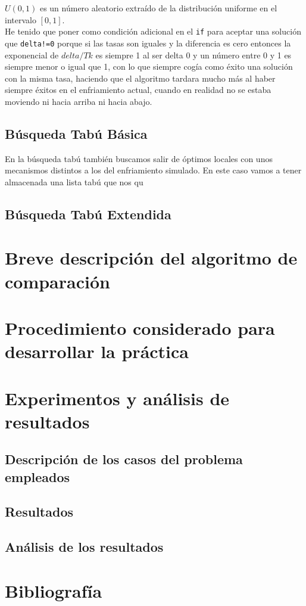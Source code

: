 \documentclass[12pt]{article}
\begin{document}
$U(0,1)$ es un número aleatorio extraído de la distribución uniforme en el intervalo $[0,1]$.\\

He tenido que poner como condición adicional en el \texttt{if} para aceptar una solución que \texttt{delta!=0} porque si las tasas son iguales y la diferencia es cero entonces la exponencial de $delta/Tk$ es siempre 1 al ser delta 0 y un número entre 0 y 1 es siempre menor o igual que 1, con lo que siempre cogía como éxito una solución con la misma tasa, haciendo que el algoritmo tardara mucho más al haber siempre éxitos en el enfriamiento actual, cuando en realidad no se estaba moviendo ni hacia arriba ni hacia abajo.

\subsection{Búsqueda Tabú Básica}
En la búsqueda tabú también buscamos salir de óptimos locales con unos mecanismos distintos a los del enfriamiento simulado. En este caso vamos a tener almacenada una lista tabú que nos qu

\subsection{Búsqueda Tabú Extendida}

\section{Breve descripción del algoritmo de comparación}

\section{Procedimiento considerado para desarrollar la práctica}

\section{Experimentos y análisis de resultados}
\subsection{Descripción de los casos del problema empleados}

\subsection{Resultados}

\subsection{Análisis de los resultados}

\section{Bibliografía}
\end{document}
